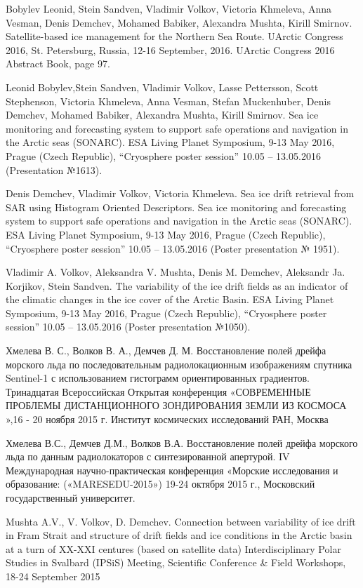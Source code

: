 Bobylev Leonid, Stein Sandven, Vladimir Volkov, Victoria Khmeleva, Anna Vesman, Denis Demchev, Mohamed Babiker, Alexandra Mushta, Kirill Smirnov. Satellite-based ice management for the Northern Sea Route. UArctic Congress 2016, St. Petersburg, Russia, 12-16 September, 2016.
UArctic Congress 2016 Abstract Book, page 97.

Leonid Bobylev,Stein Sandven, Vladimir Volkov, Lasse Pettersson, Scott Stephenson, Victoria Khmeleva, Anna Vesman, Stefan Muckenhuber, Denis Demchev, Mohamed Babiker, Alexandra Mushta, Kirill Smirnov. Sea ice monitoring and forecasting system to support safe operations and navigation in the Arctic seas (SONARC). ESA Living Planet Symposium, 9-13 May 2016, Prague (Czech Republic), “Cryosphere poster session” 10.05 – 13.05.2016 (Presentation №1613).

Denis Demchev, Vladimir Volkov, Victoria Khmeleva. Sea ice drift retrieval from SAR using Histogram Oriented Descriptors. Sea ice monitoring and forecasting system to support safe operations and navigation in the Arctic seas (SONARC). ESA Living Planet Symposium, 9-13 May 2016, Prague (Czech Republic), “Cryosphere poster session” 10.05 – 13.05.2016 (Poster presentation № 1951).

Vladimir A. Volkov, Aleksandra V. Mushta, Denis M. Demchev, Aleksandr Ja. Korjikov, Stein Sandven. The variability of the ice drift fields as an indicator of the climatic changes in the ice cover of the Arctic Basin.  ESA Living Planet Symposium, 9-13 May 2016, Prague (Czech Republic), “Cryosphere poster session” 10.05 – 13.05.2016 (Poster presentation №1050).

Хмелева В. С., Волков В. А., Демчев Д. М. Восстановление полей дрейфа морского льда по последовательным радиолокационным изображениям спутника Sentinel-1 с использованием гистограмм ориентированных градиентов. Тринадцатая Всероссийская Открытая конференция «СОВРЕМЕННЫЕ ПРОБЛЕМЫ ДИСТАНЦИОННОГО ЗОНДИРОВАНИЯ ЗЕМЛИ ИЗ КОСМОСА »,16 - 20 ноября 2015 г. Институт космических исследований РАН, Москва

Хмелева В.С., Демчев Д.М., Волков В.А. Восстановление полей дрейфа морского льда по данным радиолокаторов с синтезированной апертурой. IV  Международная научно-практическая конференция «Морские исследования и образование: («MARESEDU-2015») 19-24 октября 2015 г., Московский государственный университет.

Mushta A.V., V. Volkov, D. Demchev. Connection between variability of ice drift in Fram Strait and structure of drift fields and ice conditions in the Arctic basin at a turn of XX-XXI centures (based on satellite data) Interdisciplinary Polar Studies in Svalbard (IPSiS) Meeting, Scientific Conference \& Field Workshops, 18-24 September 2015

